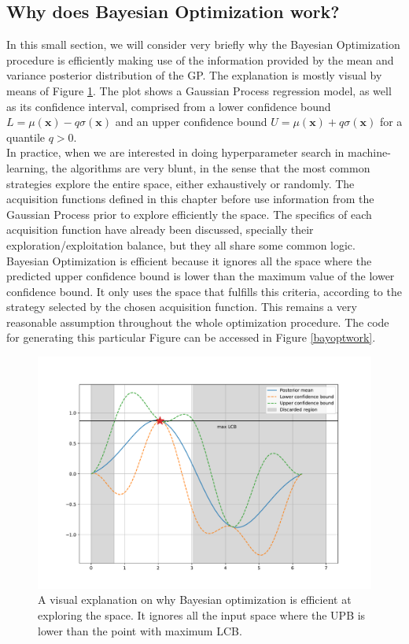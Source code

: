 \documentclass[10pt,a4paper,twoside]{book}
\begin{document}
\subsection{Why does Bayesian Optimization work?}

In this small section, we will consider very briefly why the Bayesian Optimization procedure is efficiently making use of the information provided by the mean and variance posterior distribution of the GP. The explanation is mostly visual by means of Figure \ref{fig:explanation}. The plot shows a Gaussian Process regression model, as well as its confidence interval, comprised from a lower confidence bound $L = \mu(\boldsymbol{x}) - q\sigma(\boldsymbol{x})$ and an upper confidence bound $U = \mu(\boldsymbol{x}) + q\sigma(\boldsymbol{x})$ for a quantile $q>0$.\\

In practice, when we are interested in doing hyperparameter search in machine-learning, the algorithms are very blunt, in the sense that the most common strategies explore the entire space, either exhaustively or randomly. The acquisition functions defined in this chapter before use information from the Gaussian Process prior to explore efficiently the space. The specifics of each acquisition function have already been discussed, specially their exploration/exploitation balance, but they all share some common logic.\\

Bayesian Optimization is efficient because it ignores all the space where the predicted upper confidence bound is lower than the maximum value of the lower confidence bound. It only uses the space that fulfills this criteria, according to the strategy selected by the chosen acquisition function. This remains a very reasonable assumption throughout the whole optimization procedure. The code for generating this particular Figure can be accessed in Figure \ref{bayoptwork}.

\begin{figure}
	\caption{A visual explanation on why Bayesian optimization is efficient at exploring the space. It ignores all the input space where the UPB is lower than the point with maximum LCB.}
	\label{fig:explanation}
	\includegraphics[width=\textwidth]{figures/chapter3/explanation}
\end{figure}
\end{document}
